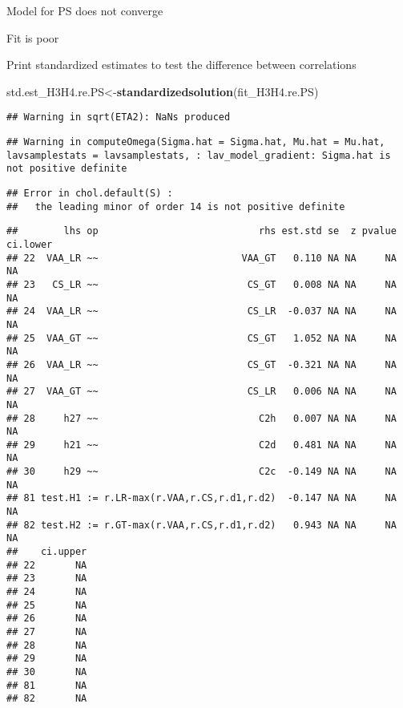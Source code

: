 \documentclass[
]{article}
\newenvironment{Shaded}{\begin{snugshade}}{\end{snugshade}}
\newcommand{\KeywordTok}[1]{\textcolor[rgb]{0.13,0.29,0.53}{\textbf{#1}}}
\newcommand{\NormalTok}[1]{#1}
\newcommand{\OperatorTok}[1]{\textcolor[rgb]{0.81,0.36,0.00}{\textbf{#1}}}
\newcommand{\StringTok}[1]{\textcolor[rgb]{0.31,0.60,0.02}{#1}}
\begin{document}
Model for PS does not converge

Fit is poor

Print standardized estimates to test the difference between correlations

\begin{Shaded}
\begin{Highlighting}[]
\NormalTok{std.est_H3H4.re.PS<-}\KeywordTok{standardizedsolution}\NormalTok{(fit_H3H4.re.PS)}
\end{Highlighting}
\end{Shaded}

\begin{verbatim}
## Warning in sqrt(ETA2): NaNs produced
\end{verbatim}

\begin{verbatim}
## Warning in computeOmega(Sigma.hat = Sigma.hat, Mu.hat = Mu.hat, lavsamplestats = lavsamplestats, : lav_model_gradient: Sigma.hat is not positive definite
\end{verbatim}

\begin{verbatim}
## Error in chol.default(S) : 
##   the leading minor of order 14 is not positive definite
\end{verbatim}

\begin{Shaded}
\end{Shaded}

\begin{verbatim}
##        lhs op                            rhs est.std se  z pvalue ci.lower
## 22  VAA_LR ~~                         VAA_GT   0.110 NA NA     NA       NA
## 23   CS_LR ~~                          CS_GT   0.008 NA NA     NA       NA
## 24  VAA_LR ~~                          CS_LR  -0.037 NA NA     NA       NA
## 25  VAA_GT ~~                          CS_GT   1.052 NA NA     NA       NA
## 26  VAA_LR ~~                          CS_GT  -0.321 NA NA     NA       NA
## 27  VAA_GT ~~                          CS_LR   0.006 NA NA     NA       NA
## 28     h27 ~~                            C2h   0.007 NA NA     NA       NA
## 29     h21 ~~                            C2d   0.481 NA NA     NA       NA
## 30     h29 ~~                            C2c  -0.149 NA NA     NA       NA
## 81 test.H1 := r.LR-max(r.VAA,r.CS,r.d1,r.d2)  -0.147 NA NA     NA       NA
## 82 test.H2 := r.GT-max(r.VAA,r.CS,r.d1,r.d2)   0.943 NA NA     NA       NA
##    ci.upper
## 22       NA
## 23       NA
## 24       NA
## 25       NA
## 26       NA
## 27       NA
## 28       NA
## 29       NA
## 30       NA
## 81       NA
## 82       NA
\end{verbatim}
\end{document}
